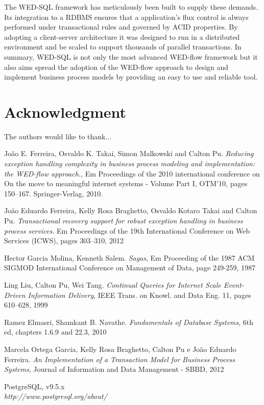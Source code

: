 \documentclass[12pt]{article}
\begin{document}
The WED-SQL framework has meticulously been built to supply these demands. Its integration to a RDBMS ensures that a application's
flux control is always performed under transactional rules and governed by ACID properties. By adopting a client-server
architecture it was designed to run in a distributed environment and be scaled to support thousands of parallel transactions.
In summary, WED-SQL is not only the most advanced WED-flow framework but it also aims spread the adoption of the WED-flow
approach to design and implement business process models by providing an easy to use and reliable tool. 


\section*{Acknowledgment}


The authors would like to thank...

\begin{thebibliography}{1}

João E. Ferreira, Osvaldo K. Takai, Simon Malkowski and Calton Pu. 
\emph{Reducing exception handling complexity in business process modeling and implementation:
the WED-flow approach.}, Em Proceedings of the 2010 international conference on
On the move to meaningful internet systems - Volume Part I, OTM’10, pages
150–167. Springer-Verlag, 2010.

João Eduardo Ferreira, Kelly Rosa Braghetto, Osvaldo Kotaro Takai and
Calton Pu.\emph{ Transactional recovery support for robust exception handling in business process
services.} Em Proceedings of the 19th International Conference on Web Services (ICWS), pages
303–310, 2012

Hector Garcia Molina, Kenneth Salem.
\emph{Sagas}, Em Proceeding of the 1987 ACM SIGMOD International Conference on Management of Data, page 249-259, 1987

Ling Liu, Calton Pu, Wei Tang.
\emph{Continual Queries for Internet Scale Event-Driven Information Delivery},
IEEE Trans. on Knowl. and Data Eng. 11, pages 610–628, 1999

Ramez Elmasri, Shamkant B. Navathe.
\emph{Fundamentals of Database Systems}, 6th ed, chapters 1.6.9 and 22.3, 2010


Marcela Ortega Garcia, Kelly Rosa Braghetto, Calton Pu e João Eduardo Ferreira.
\emph{An Implementation of a Transaction Model for Business Process Systems},
Journal of Information and Data Management - SBBD, 2012


PostgreSQL, v9.5.x \\
\emph{http://www.postgresql.org/about/}

\end{thebibliography}


\end{document}
